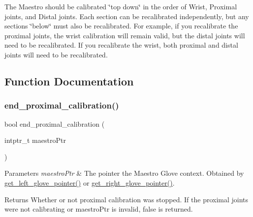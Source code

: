The Maestro should be calibrated \char`\"{}top down\char`\"{} in the order of Wrist, Proximal joints, and Distal joints. Each section can be recalibrated independently, but any sections \char`\"{}below\char`\"{} must also be recalibrated. For example, if you recalibrate the proximal joints, the wrist calibration will remain valid, but the distal joints will need to be recalibrated. If you recalibrate the wrist, both proximal and distal joints will need to be recalibrated. 

\subsection{Function Documentation}
\mbox{\label{group__glove_calibration_gaca292cd71d6b63a803381ba9a43c3d85}} 
\subsubsection{\texorpdfstring{end\+\_\+proximal\+\_\+calibration()}{end\_proximal\_calibration()}}
{\footnotesize\ttfamily bool end\+\_\+proximal\+\_\+calibration (\begin{DoxyParamCaption}\item[{intptr\+\_\+t}]{maestro\+Ptr }\end{DoxyParamCaption})}


\begin{DoxyParams}{Parameters}
{\em maestro\+Ptr} & The pointer the Maestro Glove context. Obtained by \hyperlink{group__glove_management_ga63ce3c99d4a8b8db851b22af9185764e}{get\+\_\+left\+\_\+glove\+\_\+pointer()} or \hyperlink{group__glove_management_ga9b8fd9d91aeac3f8da50f7a7eba0c32b}{get\+\_\+right\+\_\+glove\+\_\+pointer()}. \\
\hline
\end{DoxyParams}
\begin{DoxyReturn}{Returns}
Whether or not proximal calibration was stopped. If the proximal joints were not calibrating or {\ttfamily maestro\+Ptr} is invalid, {\ttfamily false} is returned. 
\end{DoxyReturn}
\mbox{\label{group__glove_calibration_gaab1a5c7b6a32fa01bfad60f964065355}} 

